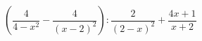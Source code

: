 \begin{ex}[type=expression]
	\begin{condition}
		\( \left( \dfrac{4}{4-x^2}-\dfrac{4}{(x-2)^2} \right) :\dfrac{2}{(2-x)^2}+\dfrac{4x+1}{x+2}\)
	\end{condition}
\end{ex}